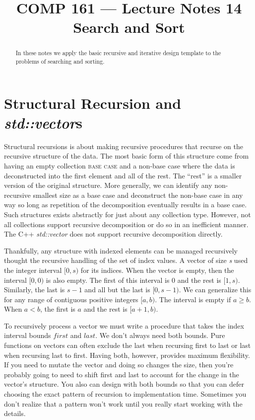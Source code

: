 \documentclass[]{tufte-handout}
\title{COMP 161 --- Lecture Notes 14 \\ Search and Sort}
\date{}
\begin{document}
\maketitle

\begin{abstract}
In these notes we apply the basic recursive and iterative design template to the problems of searching and sorting.
\end{abstract}

\section{Structural Recursion and \textit{std::vector}s}

Structural recursions is about making recursive procedures that recurse on the recursive structure of the data. The most basic form of this structure come from having an empty collection \textsc{base case} and a non-base case where the data is deconstructed into the first element and all of the rest. The ``rest'' is a smaller version of the original structure. More generally, we can identify any non-recursive smallest size as a base case and deconstruct the non-base case in any way so long as repetition of the decomposition eventually results in a base case. Such structures exists abstractly for just about any collection type.  However, not all collections support recursive decomposition or do so in an inefficient manner. The C++ \textit{std::vector} does not support recursive decomposition directly.

Thankfully, any structure with indexed elements can be managed recursively thought the recursive handling of the set of index values. A vector of size \textit{s} used the integer interval $[0,s)$ for its indices. When the vector is empty, then the interval $[0,0)$ is also empty\sidenote{$[a,b)$ is empty if $a \geq b$}. The first of this interval is $0$ and the rest is $[1,s)$. Similarly, the last is $s-1$ and all but the last is $[0,s-1)$. We can generalize this for any range of contiguous positive integers $[a,b)$. The interval is empty if $a \geq b$. When $a < b$, the first is $a$ and the rest is $[a+1,b)$.

To recursively process a vector we must write a procedure that takes the index interval bounds $first$ and $last$.  We don't always need both bounds. Pure functions on vectors can often exclude the last when recursing first to last or last when recursing last to first.  Having both, however, provides maximum flexibility.  If you need to mutate the vector and doing so changes the size, then you're probably going to need to shift first and last to account for the change in the vector's structure. You also can design with both bounds so that you can defer choosing the exact pattern of recursion to implementation time. Sometimes you don't realize that a pattern won't work until you really start working with the details.
\end{document}

